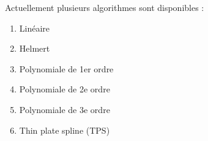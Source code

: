 \begin{enumerate}
\begin{enumerate}

Actuellement plusieurs algorithmes sont disponibles :


\begin{enumerate}
\item Linéaire
\item Helmert
\item Polynomiale de 1er ordre
\item Polynomiale de 2e ordre
\item Polynomiale de 3e ordre
\item Thin plate spline (TPS)
\end{enumerate}



\end{enumerate}
\end{enumerate}
